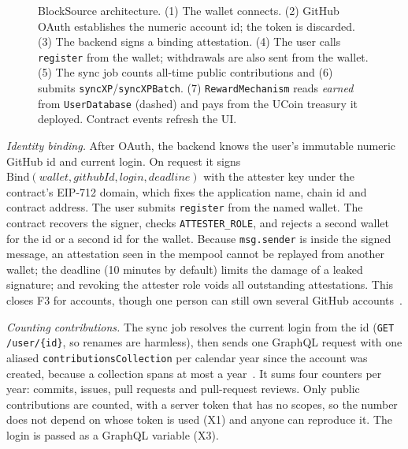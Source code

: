 \documentclass[conference]{IEEEtran}
\begin{document}
\begin{figure}[t]
{}
\caption{BlockSource architecture. (1) The wallet connects. (2) GitHub OAuth establishes the numeric account id; the token is discarded. (3) The backend signs a binding attestation. (4) The user calls \texttt{register} from the wallet; withdrawals are also sent from the wallet. (5) The sync job counts all-time public contributions and (6) submits \texttt{syncXP}/\texttt{syncXPBatch}. (7) \texttt{RewardMechanism} reads \emph{earned} from \texttt{UserDatabase} (dashed) and pays from the UCoin treasury it deployed. Contract events refresh the UI.}
\label{fig:arch}
\end{figure}

\textit{Identity binding.} After OAuth, the backend knows the user's immutable numeric GitHub id and current login. On request it signs $\mathrm{Bind}(\mathit{wallet}, \mathit{githubId}, \mathit{login}, \mathit{deadline})$ with the attester key under the contract's EIP-712 domain, which fixes the application name, chain id and contract address. The user submits \texttt{register} from the named wallet. The contract recovers the signer, checks \texttt{ATTESTER\_ROLE}, and rejects a second wallet for the id or a second id for the wallet. Because \texttt{msg.sender} is inside the signed message, an attestation seen in the mempool cannot be replayed from another wallet; the deadline (10 minutes by default) limits the damage of a leaked signature; and revoking the attester role voids all outstanding attestations. This closes F3 for accounts, though one person can still own several GitHub accounts~\cite{douceur2002sybil,siddarth2020watchmen}.

\textit{Counting contributions.} The sync job resolves the current login from the id (\texttt{GET /user/\{id\}}, so renames are harmless), then sends one GraphQL request with one aliased \texttt{contributionsCollection} per calendar year since the account was created, because a collection spans at most a year~\cite{githubdocs}. It sums four counters per year: commits, issues, pull requests and pull-request reviews. Only public contributions are counted, with a server token that has no scopes, so the number does not depend on whose token is used (X1) and anyone can reproduce it. The login is passed as a GraphQL variable (X3).
\end{document}
